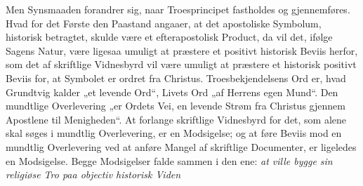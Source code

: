 \documentclass[12pt]{book}
\begin{document}
Men Synsmaaden forandrer sig, naar Troesprincipet fastholdes og
gjennemføres. Hvad for det Første den Paastand angaaer, at det
apostoliske Symbolum, historisk betragtet, skulde være et
efterapostolisk Product, da vil det, ifølge Sagens Natur, være
ligesaa umuligt at præstere et positivt historisk Beviis herfor, som
det af skriftlige Vidnesbyrd vil være umuligt at præstere et
historisk positivt Beviis for, at Symbolet er ordret fra Christus.
Troesbekjendelsens Ord er, hvad Grundtvig kalder „et levende Ord“,
Livets Ord „af Herrens egen Mund“. Den mundtlige Overlevering „er
Ordets Vei, en levende Strøm fra Christus gjennem Apostlene til
Menigheden“. At forlange skriftlige Vidnesbyrd for det, som alene
skal søges i mundtlig Overlevering, er en Modsigelse; og at føre
Beviis mod en mundtlig Overlevering ved at anføre Mangel af
skriftlige Documenter, er ligeledes en Modsigelse. Begge Modsigelser
falde sammen i den ene: \emph{at ville bygge sin religiøse Tro paa
objectiv historisk Viden}%
\end{document}
